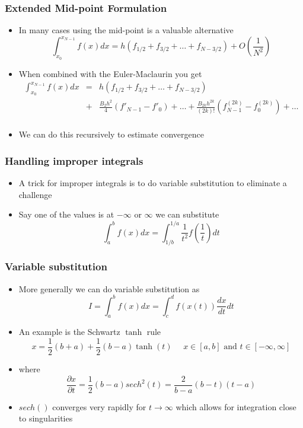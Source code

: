 \documentclass[10pt]{beamer}
\begin{document}
\begin{frame}
  \frametitle{Extended Mid-point Formulation}
  \begin{itemize}
  \item In many cases using the mid-point is a valuable alternative
    \[
      \int_{x_0}^{x_{N-1}} f(x) dx = h (f_{1/2} + f_{3/2} + \ldots + f_{N-3/2}) + O(\frac{1}{N^2})
    \]
  \item When combined with the Euler-Maclaurin you get
    \[
      \begin{array}{rcl}
        \int_{x_0}^{x_{N-1}} f(x) dx &=& h (f_{1/2} + f_{3/2} + \ldots + f_{N-3/2}) \\
                & + & \frac{B_2 h^2}{4} (f'_{N-1} - f'_0) + \ldots + \frac{B_{2k} h^{2k}}{(2k)!} (f^{(2k)}_{N-1} - f^{(2k)}_0) + \ldots \\
      \end{array}
    \]
  \item We can do this recursively to estimate convergence
  \end{itemize}
\end{frame}

\begin{frame}
  \frametitle{Handling improper integrals}
  \begin{itemize}
  \item A trick for improper integrals is to do variable substitution to eliminate a challenge
  \item Say one of the values is at $-\infty$ or $\infty$ we can substitute
    \[
      \int_a^b f(x) dx = \int_{1/b}^{1/a} \frac{1}{t^2} f\left( \frac{1}{t} \right) dt
    \]
  \end{itemize}
\end{frame}

\begin{frame}
  \frametitle{Variable substitution}
  \begin{itemize}
  \item More generally we can do variable substitution as
    \[
      I = \int_a^b f(x) dx = \int_c^d f(x(t)) \frac{dx}{dt} dt
    \]
  \item An example is the Schwartz $\tanh$ rule
    \[
      x = \frac{1}{2} (b+a) + \frac{1}{2} (b-a) \tanh(t) \mbox{~~~ } x\in[a,b] \mbox{ and } t\in[-\infty,\infty]
    \]
  \item where
    \[
      \frac{\partial x}{\partial t} = \frac{1}{2} (b-a) sech^2(t) = \frac{2}{b-a} (b-t) (t-a)
    \]
  \item $sech()$ converges very rapidly for $t\rightarrow \infty$ which allows for integration close to singularities
  \end{itemize}
\end{frame}
\end{document}

